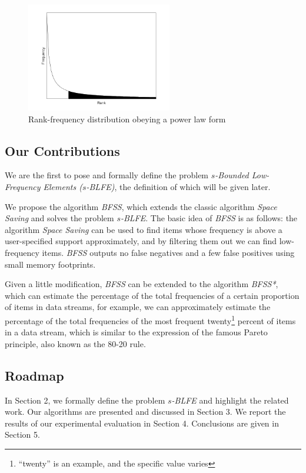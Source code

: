 \documentclass[conference]{IEEEtran}
\begin{document}
\begin{figure}
	\centering
	\includegraphics[width=2.5in]{png/zipf.png}
	\caption{Rank-frequency distribution obeying a power law form}
	\label{fig:sim}
\end{figure}

\subsection{Our Contributions}
We are the first to pose and formally define the problem $s$\emph{-Bounded Low-Frequency Elements ($s$-BLFE)}, the definition of which will be given later.\par

We propose the algorithm \emph{BFSS}, which extends the classic algorithm \emph{Space Saving} and solves the problem \emph{$s$-BLFE}. The basic idea of \emph{BFSS} is as follows: the algorithm \emph{Space Saving} can be used to find items whose frequency is above a user-specified support approximately, and by filtering them out we can find low-frequency items. \emph{BFSS} outputs no false negatives and a few false positives using small memory footprints.\par

Given a little modification, \emph{BFSS} can be extended to the algorithm \emph{BFSS*}, which can estimate the percentage of the total frequencies of a certain proportion of items in data streams, for example, we can approximately estimate the percentage of the total frequencies of the most frequent twenty\footnote{``twenty'' is an example, and the specific value varies} percent of items in a data stream, which is similar to the expression of the famous Pareto principle, also known as the 80-20 rule.

\subsection{Roadmap}
In Section 2, we formally define the problem \emph{$s$-BLFE} and highlight the related work. Our algorithms are presented and discussed in Section 3. We report the results of our experimental evaluation in Section 4. Conclusions are given in Section 5.
\end{document}
